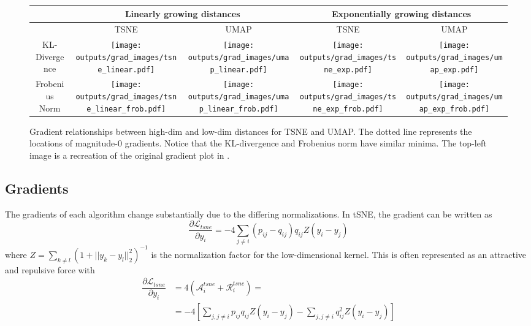 \documentclass[sigconf, nonacm]{acmart}
\begin{document}
\begin{figure*}[h]
    \begin{tabular}{|c|c|c|c|c|}
        \hline
        & \multicolumn{2}{|c|}{Linearly growing distances} & \multicolumn{2}{|c|}{Exponentially growing distances} \\
        \hline
        & TSNE & UMAP & TSNE & UMAP \\
        \hline
        KL-Divergence &
        \texttt{[image: outputs/grad\_images/tsne\_linear.pdf]} & 
        \texttt{[image: outputs/grad\_images/umap\_linear.pdf]} & 
        \texttt{[image: outputs/grad\_images/tsne\_exp.pdf]} & 
        \texttt{[image: outputs/grad\_images/umap\_exp.pdf]}\\
        \hline
        Frobenius Norm &
        \texttt{[image: outputs/grad\_images/tsne\_linear\_frob.pdf]} & 
        \texttt{[image: outputs/grad\_images/umap\_linear\_frob.pdf]} & 
        \texttt{[image: outputs/grad\_images/tsne\_exp\_frob.pdf]} & 
        \texttt{[image: outputs/grad\_images/umap\_exp\_frob.pdf]}\\
        \hline
    \end{tabular}
\caption{Gradient relationships between high-dim and low-dim distances for TSNE and UMAP. The dotted line represents the locations of magnitude-$0$ gradients.
Notice that the KL-divergence and Frobenius norm have similar minima. The top-left image is a recreation of the original gradient plot in \cite{van2008visualizing}.}
\label{grad_plots}
\end{figure*}

\subsection{Gradients}

The gradients of each algorithm change substantially due to the differing normalizations. In tSNE, the gradient can be written as
\begin{equation}
    \dfrac{\partial \mathcal{L}_{tsne}}{\partial y_i} = -4 \sum_{j \neq i} (p_{ij} - q_{ij}) q_{ij} Z (y_i - y_j)
\end{equation}
where $Z = \sum_{k \neq l} (1 + ||y_k - y_l||_2^2)^{-1}$ is the normalization factor for the low-dimensional kernel. This is often represented as an attractive
and repulsive force with
\begin{align*}
    \dfrac{\partial \mathcal{L}_{tsne}}{\partial y_i} &= 4(\mathcal{A}_i^{tsne} + \mathcal{R}_i^{tsne}) = \\
    &= -4 \left[ \sum_{j, j \neq i} p_{ij}q_{ij}Z (y_i - y_j) - \sum_{j, j \neq i} q_{ij}^2 Z (y_i - y_j) \right]
\end{align*}
\end{document}
